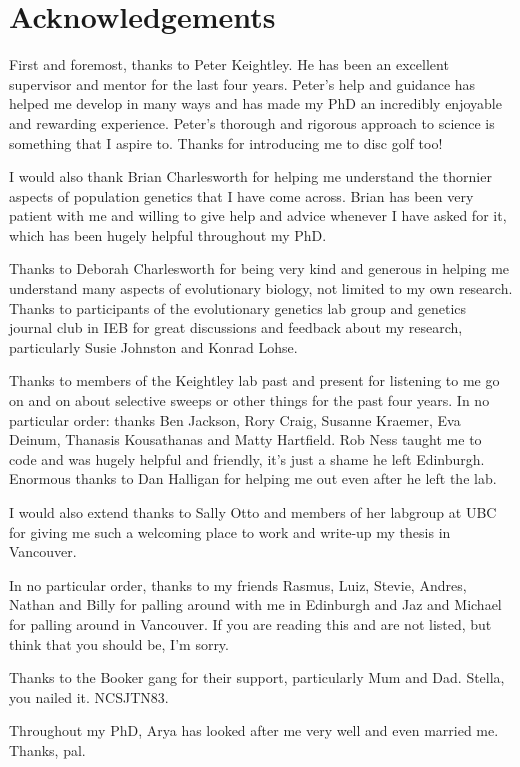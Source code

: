 \chapter{Acknowledgements}

First and foremost, thanks to Peter Keightley. He has been an excellent supervisor and mentor for the last four years. Peter's help and guidance has helped me develop in many ways and has made my PhD an incredibly enjoyable and rewarding experience. Peter's thorough and rigorous approach to science is something that I aspire to. Thanks for introducing me to disc golf too!

I would also thank Brian Charlesworth for helping me understand the thornier aspects of population genetics that I have come across. Brian has been very patient with me and willing to give help and advice whenever I have asked for it, which has been hugely helpful throughout my PhD.

Thanks to Deborah Charlesworth for being very kind and generous in helping me understand many aspects of evolutionary biology, not limited to my own research. Thanks to participants of the evolutionary genetics lab group and genetics journal club in IEB for great discussions and feedback about my research, particularly Susie Johnston and Konrad Lohse.

Thanks to members of the Keightley lab past and present for listening to me go on and on about selective sweeps or other things for the past four years. In no particular order: thanks Ben Jackson, Rory Craig, Susanne Kraemer, Eva Deinum, Thanasis Kousathanas and Matty Hartfield. Rob Ness taught me to code and was hugely helpful and friendly, it's just a shame he left Edinburgh. Enormous thanks to Dan Halligan for helping me out even after he left the lab.

I would also extend thanks to Sally Otto and members of her labgroup at UBC for giving me such a welcoming place to work and write-up my thesis in Vancouver.

In no particular order, thanks to my friends Rasmus, Luiz, Stevie, Andres, Nathan and Billy for palling around with me in Edinburgh and Jaz and Michael for palling around in Vancouver. If you are reading this and are not listed, but think that you should be, I'm sorry.

Thanks to the Booker gang for their support, particularly Mum and Dad. Stella, you nailed it. NCSJTN83.

Throughout my PhD, Arya has looked after me very well and even married me. Thanks, pal.